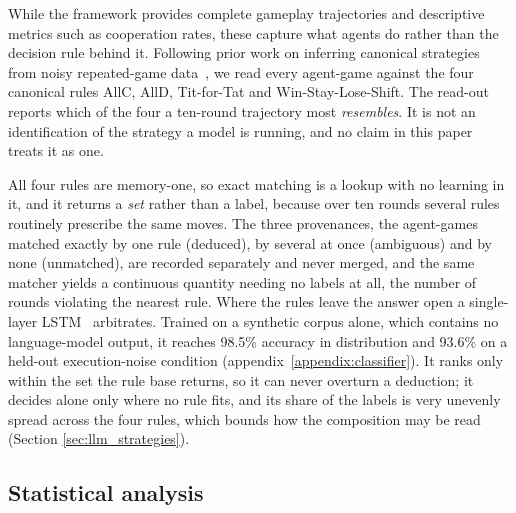 \documentclass[11pt,a4paper]{article}
\begin{document}
While the framework provides complete gameplay trajectories and descriptive
metrics such as cooperation rates, these capture what agents do rather than the
decision rule behind it. Following prior work on inferring canonical strategies
from noisy repeated-game data~\cite{han2013intention,Han2012ALIFEjournal,diStefanoIntention2023},
we read every agent-game against the four canonical rules AllC, AllD,
Tit-for-Tat and Win-Stay-Lose-Shift. The read-out reports which of the four a
ten-round trajectory most \emph{resembles}. It is not an identification of the
strategy a model is running, and no claim in this paper treats it as one.

All four rules are memory-one, so exact matching is a lookup with no learning
in it, and it returns a \emph{set} rather than a label, because over ten rounds
several rules routinely prescribe the same moves. The three provenances, the
agent-games matched exactly by one rule (deduced), by several at once
(ambiguous) and by none (unmatched), are recorded separately and never merged,
and the same matcher yields a continuous quantity needing no labels at all, the
number of rounds violating the nearest rule. Where the rules leave the answer
open a single-layer LSTM~\cite{lstm} arbitrates. Trained on a synthetic corpus alone, which contains no language-model output, it reaches 98.5\% accuracy in distribution and 93.6\% on a held-out
execution-noise condition (appendix~\ref{appendix:classifier}). It ranks only within the set the
rule base returns, so it can never overturn a deduction; it decides alone only
where no rule fits, and its share of the labels is very unevenly spread across
the four rules, which bounds how the composition may be read
(Section \ref{sec:llm_strategies}).

\subsection{Statistical analysis}\label{sec:stats}
\end{document}
